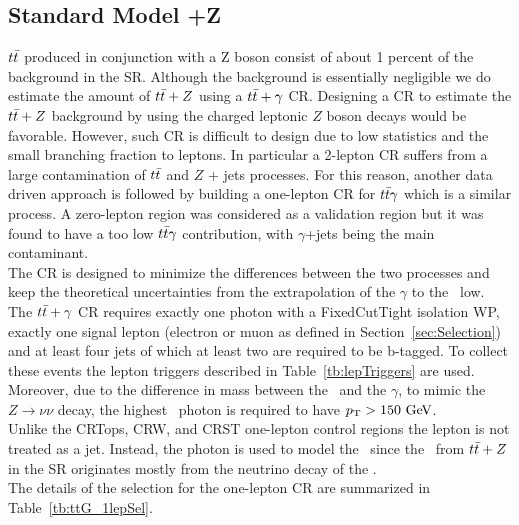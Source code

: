 \subsection{Standard Model \ttbar+Z}
\label{sec:Bkg:ttV}

$t\bar{t}$ produced in conjunction with a Z boson consist of about 1 percent of the background in the SR.  Although the background is essentially negligible we do estimate the amount of $t\bar{t}+Z$ using a $t\bar{t}+\gamma$ CR. Designing a CR to estimate the $t\bar{t}+Z$ background by using the charged leptonic $Z$ boson decays would be favorable. However, such CR is difficult to design due to low statistics and the small branching fraction to leptons. In particular a 2-lepton CR suffers from a large contamination of $t\bar{t}$ and $Z$ + jets processes. For this reason, another data driven approach is followed by building a one-lepton CR for $t\bar{t}\gamma$ which is a similar process. A zero-lepton region was considered as a validation region but it was found to have a too low $t\bar{t}\gamma$ contribution, with $\gamma$+jets being the main contaminant.\\
The CR is designed to minimize the differences between the two processes and keep the theoretical uncertainties from the extrapolation of the $\gamma$ to the \Zboson\ low. \\

The $t\bar{t}+\gamma$ CR requires exactly one photon with a FixedCutTight isolation WP, exactly one signal lepton (electron or muon as defined in Section~\ref{sec:Selection}) and at least four jets of which at least two are required to be b-tagged. To collect these events the lepton triggers described in Table~\ref{tb:lepTriggers} are used. \\
Moreover, due to the difference in mass between the \Zboson\ and the $\gamma$, to mimic the $Z \rightarrow \nu\nu$ decay, the highest \pT\ photon is required to have $\pt>150\gev$. \\ %
Unlike the CRTops, CRW, and CRST one-lepton control regions the lepton is not treated as a jet. Instead, the photon is used to model the \met\ since the \met\ from $t\bar{t}+Z$ in the SR originates mostly from the neutrino decay of the \Zboson. \\
The details of the selection for the one-lepton CR are summarized in Table~\ref{tb:ttG_1lepSel}.\\


